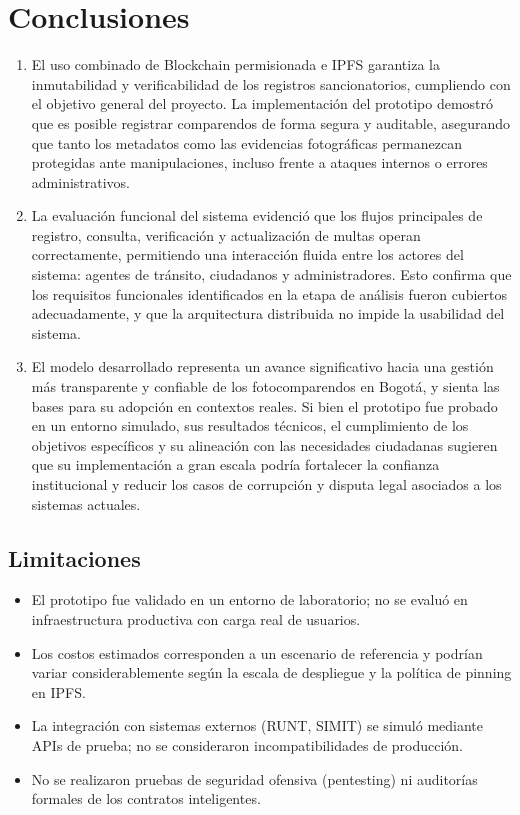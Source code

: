 \section{Conclusiones}
\begin{enumerate}
    \item El uso combinado de Blockchain permisionada e IPFS garantiza la inmutabilidad y verificabilidad de los registros sancionatorios, cumpliendo con el objetivo general del proyecto. La implementación del prototipo demostró que es posible registrar comparendos de forma segura y auditable, asegurando que tanto los metadatos como las evidencias fotográficas permanezcan protegidas ante manipulaciones, incluso frente a ataques internos o errores administrativos.
    \item La evaluación funcional del sistema evidenció que los flujos principales de registro, consulta, verificación y actualización de multas operan correctamente, permitiendo una interacción fluida entre los actores del sistema: agentes de tránsito, ciudadanos y administradores. Esto confirma que los requisitos funcionales identificados en la etapa de análisis fueron cubiertos adecuadamente, y que la arquitectura distribuida no impide la usabilidad del sistema.
    \item El modelo desarrollado representa un avance significativo hacia una gestión más transparente y confiable de los fotocomparendos en Bogotá, y sienta las bases para su adopción en contextos reales. Si bien el prototipo fue probado en un entorno simulado, sus resultados técnicos, el cumplimiento de los objetivos específicos y su alineación con las necesidades ciudadanas sugieren que su implementación a gran escala podría fortalecer la confianza institucional y reducir los casos de corrupción y disputa legal asociados a los sistemas actuales.
\end{enumerate}

\subsection*{Limitaciones}
\begin{itemize}
  \item El prototipo fue validado en un entorno de laboratorio; no se evaluó en infraestructura productiva con carga real de usuarios.
  \item Los costos estimados corresponden a un escenario de referencia y podrían variar considerablemente según la escala de despliegue y la política de pinning en IPFS.
  \item La integración con sistemas externos (RUNT, SIMIT) se simuló mediante APIs de prueba; no se consideraron incompatibilidades de producción.
  \item No se realizaron pruebas de seguridad ofensiva (pentesting) ni auditorías formales de los contratos inteligentes.
\end{itemize}


